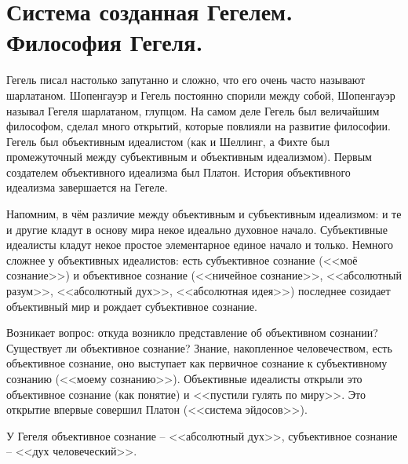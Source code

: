 

\section{Система созданная Гегелем. Философия Гегеля.}


Гегель писал настолько запутанно и сложно, что его очень часто называют шарлатаном. Шопенгауэр и Гегель постоянно спорили между собой, Шопенгауэр называл Гегеля шарлатаном, глупцом. На самом деле Гегель был величайшим философом, сделал много открытий, которые повлияли на развитие философии. Гегель был объективным идеалистом (как и Шеллинг, а Фихте был промежуточный между субъективным и объективным идеализмом). Первым создателем объективного идеализма был Платон. История объективного идеализма завершается на Гегеле.

Напомним, в чём различие между объективным и субъективным идеализмом: и те и другие кладут в основу мира некое идеально духовное начало. Субъективные идеалисты кладут некое простое элементарное единое начало и только. Немного сложнее у объективных идеалистов: есть субъективное сознание (<<моё сознание>>) и объективное сознание (<<ничейное сознание>>, <<абсолютный разум>>, <<абсолютный дух>>, <<абсолютная идея>>) последнее созидает объективный мир и рождает субъективное сознание.

Возникает вопрос: откуда возникло представление об объективном сознании? Существует ли объективное сознание? Знание, накопленное человечеством, есть объективное сознание, оно выступает как первичное сознание к субъективному сознанию (<<моему сознанию>>). Объективные идеалисты открыли это объективное сознание (как понятие) и <<пустили гулять по миру>>. Это открытие впервые совершил Платон (<<система эйдосов>>).

У Гегеля объективное сознание – <<абсолютный дух>>, субъективное сознание – <<дух человеческий>>.

